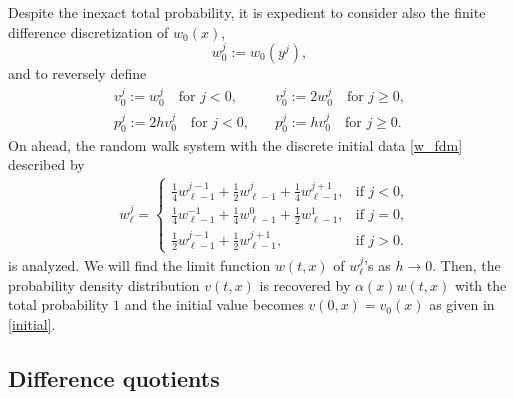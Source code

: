 \documentclass[a4paper,11pt]{article}
\theoremstyle{remark}
\begin{document}
Despite the inexact total probability, it is expedient to consider also the finite difference discretization of $w_0(x)$,
\begin{equation}\label{w_fdm}
w^{j}_0:=w_0(y^j),
\end{equation}
and to reversely define  
\begin{align*}
 v^j_0:=w^j_0 \quad \text{for $j<0$}, \quad &v^j_0:=2w^j_0 \quad \text{for $j\ge0$},\\
 p^j_0:=2hv^j_0\quad \text{for $j<0$}, \quad &p^j_0:=hv^j_0 \quad \text{for $j\ge0$}.
\end{align*}
On ahead, the random walk system with the discrete initial data \eqref{w_fdm} described by 
\begin{equation} \label{RW3}\tag{RW3}
\begin{aligned}
    &w^{j}_\ell = \left\{\begin{array}{ll}
        \frac{1}{4}w^{j-1} _{\ell-1} + \frac{1}{2}w ^{j} _{\ell-1} +
        \frac{1}{4} w^{j+1}_{\ell-1}, & \text{if $j<0$},\\
        \frac{1}{4}w^{-1} _{\ell-1} + \frac{1}{4}w^{0} _{\ell-1} +
        \frac{1}{2}w ^{1} _{\ell-1}, & \text{if $j=0$},\\
        \frac{1}{2}w^{j-1} _{\ell-1} + \frac{1}{2}w ^{j+1} _{\ell-1}, &
        \text{if } j>0.
        \end{array}\right.
\end{aligned}
\end{equation}
is analyzed. We will find the limit function $w(t,x)$ of $w_\ell^j$'s as $h\to0$. Then, the probability density distribution $v(t,x)$ is recovered by $\alpha(x)w(t,x)$ with the total probability $1$ and the initial value becomes $v(0,x)=v_0(x)$ as given in \eqref{initial}.

\subsection{Difference quotients}
\end{document}
